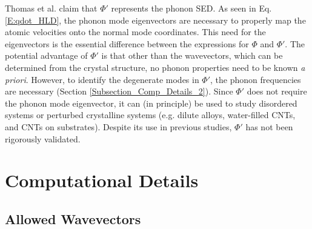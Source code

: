 \documentclass[12pt,twocolumn,iop]{/usr/share/texmf-texlive/tex/latex/iop/iopart}[/usr/share/texmf-texlive/tex/latex/iop/]
\begin{document}
Thomas et al. \cite{thomas2010c} claim that $\Phi'$ represents the phonon SED. As seen in Eq$.$ \eqref{E:qdot_HLD}, the phonon mode eigenvectors are necessary to properly map the atomic velocities onto the normal mode coordinates. This need for the eigenvectors is the essential difference between the expressions for $\Phi$ and $\Phi'$. The potential advantage of $\Phi'$ is that other than the wavevectors, which can be determined from the crystal structure, no phonon properties need to be known {\em a priori}. However, to identify the degenerate modes in $\Phi'$, the phonon frequencies are necessary (Section \ref{Subsection_Comp_Details_2}). Since $\Phi'$ does not require the phonon mode eigenvector, it can (in principle) be used to study disordered systems or perturbed crystalline systems (e.g. dilute alloys,\cite{shiomi2011a} water-filled CNTs,\cite{thomas2010c} and CNTs on substrates\cite{shiomi2011b}). Despite its use in previous studies, $\Phi'$ has not been rigorously validated.

\section{\label{Section_Comp}Computational Details}

\subsection{\label{Subsection_Comp_Details_1}Allowed Wavevectors}
\end{document}
